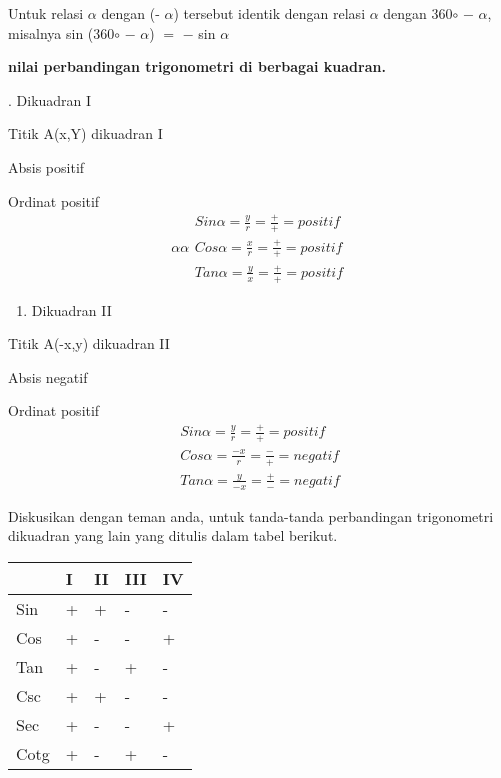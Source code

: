 \documentclass[11pt,fleqn]{book} %
\begin{document}
\begin{myEnumerate}
\begin{itemize}
\noindent 

\noindent 

\noindent Untuk relasi $\alpha$  dengan (- $\alpha$) tersebut identik dengan relasi $\alpha$ dengan 360$\circ$ $-$ $\alpha$, misalnya sin (360$\circ$ $-$ $\alpha$) $=$ $-$ sin $\alpha$

\noindent 

\noindent \textbf{nilai perbandingan trigonometri di berbagai kuadran.}

\noindent \textbf{}

. Dikuadran I

Titik A(x,Y) dikuadran I

Absis positif

Ordinat positif
\[\alpha \alpha   \begin{array}{l} {Sin\alpha =\frac{y}{r} =\frac{+}{+} =positif} \\ {Cos\alpha =\frac{x}{r} =\frac{+}{+} =positif} \\ {Tan\alpha =\frac{y}{x} =\frac{+}{+} =positif} \end{array}\] 


\noindent 

\noindent 

\noindent 

\noindent 

\noindent 

\noindent 

\noindent 

\begin{enumerate}
\item  Dikuadran II
\end{enumerate}

\noindent Titik A(-x,y) dikuadran II

\noindent Absis negatif

\noindent Ordinat positif
\[\begin{array}{l} {Sin\alpha =\frac{y}{r} =\frac{+}{+} =positif} \\ {Cos\alpha =\frac{-x}{r} =\frac{-}{+} =negatif} \\ {Tan\alpha =\frac{y}{-x} =\frac{+}{-} =negatif} \end{array}\] 



Diskusikan dengan teman anda, untuk tanda-tanda perbandingan trigonometri dikuadran yang lain yang ditulis dalam tabel berikut.

\begin{tabular}{|p{0.8in}|p{0.7in}|p{0.8in}|p{0.8in}|p{0.8in}|} \hline 
& I & II & III & IV \\ \hline 
Sin & + & + & - & - \\ \hline 
Cos & + & - & - & + \\ \hline 
Tan & + & - & + & - \\ \hline 
Csc & + & + & - & - \\ \hline 
Sec & + & - & - & + \\ \hline 
Cotg & + & - & + & - \\ \hline 
\end{tabular}






\end{itemize}
\end{myEnumerate}
\end{document}
